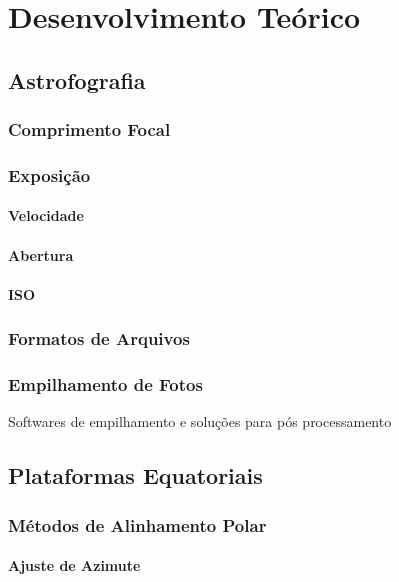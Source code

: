 \chapter{Desenvolvimento Teórico}

\section{Astrofografia}


\subsection{Comprimento Focal}

\subsection{Exposição}
\subsubsection{Velocidade}
\subsubsection{Abertura}
\subsubsection{ISO}

\subsection{Formatos de Arquivos}

\subsection{Empilhamento de Fotos}

Softwares de empilhamento e soluções para pós processamento

\section{Plataformas Equatoriais}

\subsection{Métodos de Alinhamento Polar}

\subsubsection{Ajuste de Azimute}

